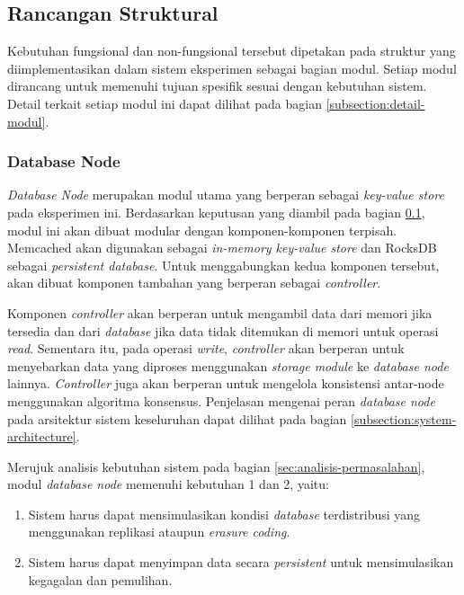 \subsection{Rancangan Struktural}
\label{subsection:rancangan-struktural}

Kebutuhan fungsional dan non-fungsional tersebut dipetakan pada struktur yang diimplementasikan dalam sistem eksperimen sebagai bagian modul. Setiap modul dirancang untuk memenuhi tujuan spesifik sesuai dengan kebutuhan sistem. Detail terkait setiap modul ini dapat dilihat pada bagian \ref{subsection:detail-modul}.

\subsubsection{Database Node}
\label{subsubsection:database-node}

\textit{Database Node} merupakan modul utama yang berperan sebagai \textit{key-value store} pada eksperimen ini. Berdasarkan keputusan yang diambil pada bagian \ref{subsection:rancangan-struktural}, modul ini akan dibuat modular dengan komponen-komponen terpisah. Memcached akan digunakan sebagai \textit{in-memory key-value store} dan RocksDB sebagai \textit{persistent database}. Untuk menggabungkan kedua komponen tersebut, akan dibuat komponen tambahan yang berperan sebagai \textit{controller}.

Komponen \textit{controller} akan berperan untuk mengambil data dari memori jika tersedia dan dari \textit{database} jika data tidak ditemukan di memori untuk operasi \textit{read}. Sementara itu, pada operasi \textit{write}, \textit{controller} akan berperan untuk menyebarkan data yang diproses menggunakan \textit{storage module} ke \textit{database node} lainnya. \textit{Controller} juga akan berperan untuk mengelola konsistensi antar-node menggunakan algoritma konsensus. Penjelasan mengenai peran \textit{database node} pada arsitektur sistem keseluruhan dapat dilihat pada bagian \ref{subsection:system-architecture}.

Merujuk analisis kebutuhan sistem pada bagian \ref{sec:analisis-permasalahan}, modul \textit{database node} memenuhi kebutuhan 1 dan 2, yaitu:

\begin{enumerate}
    \item Sistem harus dapat mensimulasikan kondisi \textit{database} terdistribusi yang menggunakan replikasi ataupun \textit{erasure coding}.
    \item Sistem harus dapat menyimpan data secara \textit{persistent} untuk mensimulasikan kegagalan dan pemulihan.
\end{enumerate}

